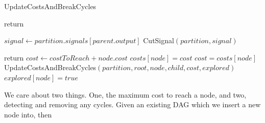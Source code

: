\documentclass[12pt,final,oneside]{dwThesis} %
\begin{document}
\begin{algorithm}
\begin{center}
      \end{center}
      \caption{UpdateCostsAndBreakCycles}\label{updatecosts}

      \begin{algorithmic}[1]
            
         \State return \EndIf {} 

         \State $signal \gets partition.signals[parent.output]$  
         \State CutSignal$(partition, signal)$

         \State return \EndIf 
         \State $cost \gets costToReach+node.cost$
         \State $costs[node] = cost$ \Else 
         \State
         $cost = costs[node]$ \EndIf {} 
         \State
         UpdateCostsAndBreakCycles$(partition, root, node, child, cost,
         explored)$ \EndFor 
         \State $explored[node] = true$ \EndProcedure

      \end{algorithmic}

   \end{algorithm}
   We care about two things. One, the
   maximum cost to reach a node, and two, detecting and removing any cycles.
   Given an existing \gls{DAG} which we insert a new node into, then
\end{document}
